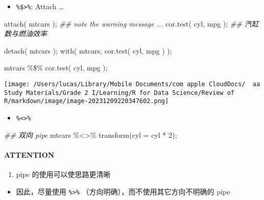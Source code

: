 \documentclass[
]{article}
\let\oldincludegraphics\includegraphics
\renewcommand{\includegraphics}[2][]{\begin{center}\oldincludegraphics[#1]{#2}\end{center}}
\newenvironment{Shaded}{}{}
\newcommand{\AttributeTok}[1]{\textcolor[rgb]{0.49,0.56,0.16}{#1}}
\newcommand{\DecValTok}[1]{\textcolor[rgb]{0.25,0.63,0.44}{#1}}
\newcommand{\DocumentationTok}[1]{\textcolor[rgb]{0.73,0.13,0.13}{\textit{#1}}}
\newcommand{\FunctionTok}[1]{\textcolor[rgb]{0.02,0.16,0.49}{#1}}
\newcommand{\NormalTok}[1]{#1}
\newcommand{\SpecialCharTok}[1]{\textcolor[rgb]{0.25,0.44,0.63}{#1}}
\begin{document}
\begin{itemize}
\item
  \texttt{\%\$\textgreater{}\%}: Attach \ldots{}
\end{itemize}

\begin{Shaded}
\begin{Highlighting}[]
\FunctionTok{attach}\NormalTok{( mtcars ); }\DocumentationTok{\#\# note the warning message ... }
\FunctionTok{cor.test}\NormalTok{( cyl, mpg ); }\DocumentationTok{\#\# 汽缸数与燃油效率}

\FunctionTok{detach}\NormalTok{( mtcars );}
\FunctionTok{with}\NormalTok{( mtcars, }\FunctionTok{cor.test}\NormalTok{( cyl, mpg ) );}

\NormalTok{mtcars }\SpecialCharTok{\%\$\%} 
\FunctionTok{cor.test}\NormalTok{( cyl, mpg );}
\end{Highlighting}
\end{Shaded}

\texttt{[image: /Users/lucas/Library/Mobile Documents/com~apple~CloudDocs/~~aa Study Materials/Grade 2 I/Learning/R for Data Science/Review of R/markdown/image/image-20231209220347602.png]}

\begin{itemize}
\item
  \texttt{\%\textless{}\textgreater{}\%}
\end{itemize}

\begin{Shaded}
\begin{Highlighting}[]
\DocumentationTok{\#\# 双向 pipe }
\NormalTok{mtcars }\SpecialCharTok{\%\textless{}\textgreater{}\%} \FunctionTok{transform}\NormalTok{(}\AttributeTok{cyl =}\NormalTok{ cyl }\SpecialCharTok{*} \DecValTok{2}\NormalTok{);}
\end{Highlighting}
\end{Shaded}

\hypertarget{attention}{%
\paragraph{\texorpdfstring{\textbf{ATTENTION}}{ATTENTION}}\label{attention}}

\begin{enumerate}
\def\labelenumi{\arabic{enumi}.}
\item
  pipe 的使用可以使思路更清晰
\end{enumerate}

\begin{itemize}
\item
  因此，尽量使用 \texttt{\%\textgreater{}\%}
  （方向明确），而不使用其它方向不明确的 pipe
\end{itemize}
\end{document}
